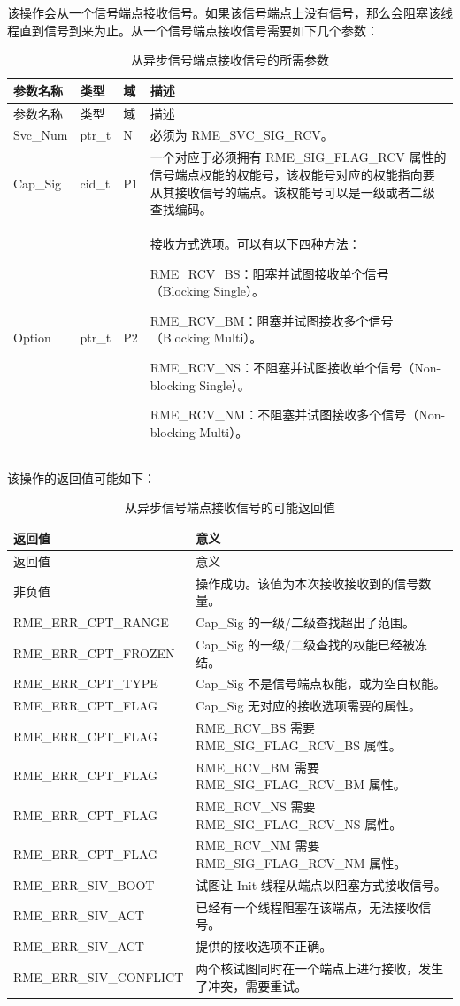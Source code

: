 该操作会从一个信号端点接收信号。如果该信号端点上没有信号，那么会阻塞该线程直到信号到来为止。从一个信号端点接收信号需要如下几个参数：

\begin{xltabular}{\textwidth}{@{}>{\hsize\raggedright\arraybackslash}X>{\hsize\raggedright\arraybackslash}X>{\hsize\raggedright\arraybackslash}X>{\hsize\raggedright\arraybackslash}X@{}}
\caption{从异步信号端点接收信号的所需参数}\label{tab:5-22-receive-signal-parameters}\\
\toprule
参数名称 & 类型 & 域 & 描述\tabularnewline
\endfirsthead
\toprule
参数名称 & 类型 & 域 & 描述\tabularnewline
\midrule
\endhead
\bottomrule
\endlastfoot
Svc\_Num & ptr\_t & N & 必须为 RME\_SVC\_SIG\_RCV。\tabularnewline
Cap\_Sig & cid\_t & P1 &
一个对应于必须拥有 RME\_SIG\_FLAG\_RCV 属性的信号端点权能的权能号，该权能号对应的权能指向要从其接收信号的端点。该权能号可以是一级或者二级查找编码。\tabularnewline
Option\strut
 & ptr\_t\strut
 & P2\strut
 & 接收方式选项。可以有以下四种方法：

RME\_RCV\_BS：阻塞并试图接收单个信号（Blocking Single）。

RME\_RCV\_BM：阻塞并试图接收多个信号（Blocking Multi）。

RME\_RCV\_NS：不阻塞并试图接收单个信号（Non-blocking Single）。

RME\_RCV\_NM：不阻塞并试图接收多个信号（Non-blocking Multi）。\strut
\tabularnewline
\end{xltabular}

该操作的返回值可能如下：

\begin{xltabular}{\textwidth}{@{}>{\hsize\raggedright\arraybackslash}X>{\hsize\raggedright\arraybackslash}X@{}}
\caption{从异步信号端点接收信号的可能返回值}\label{tab:5-23-receive-signal-return-values}\\
\toprule
返回值 & 意义\tabularnewline
\endfirsthead
\toprule
返回值 & 意义\tabularnewline
\midrule
\endhead
\bottomrule
\endlastfoot
    非负值 & 操作成功。该值为本次接收接收到的信号数量。\tabularnewline
    RME\_ERR\_CPT\_RANGE & Cap\_Sig 的一级/二级查找超出了范围。\tabularnewline
    RME\_ERR\_CPT\_FROZEN & Cap\_Sig 的一级/二级查找的权能已经被冻结。\tabularnewline
    RME\_ERR\_CPT\_TYPE & Cap\_Sig 不是信号端点权能，或为空白权能。\tabularnewline
    RME\_ERR\_CPT\_FLAG & Cap\_Sig 无对应的接收选项需要的属性。\tabularnewline
    RME\_ERR\_CPT\_FLAG & RME\_RCV\_BS 需要 RME\_SIG\_FLAG\_RCV\_BS 属性。\tabularnewline
    RME\_ERR\_CPT\_FLAG & RME\_RCV\_BM 需要 RME\_SIG\_FLAG\_RCV\_BM 属性。\tabularnewline
    RME\_ERR\_CPT\_FLAG & RME\_RCV\_NS 需要 RME\_SIG\_FLAG\_RCV\_NS 属性。\tabularnewline
    RME\_ERR\_CPT\_FLAG & RME\_RCV\_NM 需要 RME\_SIG\_FLAG\_RCV\_NM 属性。\tabularnewline
    RME\_ERR\_SIV\_BOOT & 试图让 Init 线程从端点以阻塞方式接收信号。\tabularnewline
    RME\_ERR\_SIV\_ACT & 已经有一个线程阻塞在该端点，无法接收信号。\tabularnewline
    RME\_ERR\_SIV\_ACT & 提供的接收选项不正确。\tabularnewline
    RME\_ERR\_SIV\_CONFLICT & 两个核试图同时在一个端点上进行接收，发生了冲突，需要重试。\tabularnewline
\end{xltabular}

